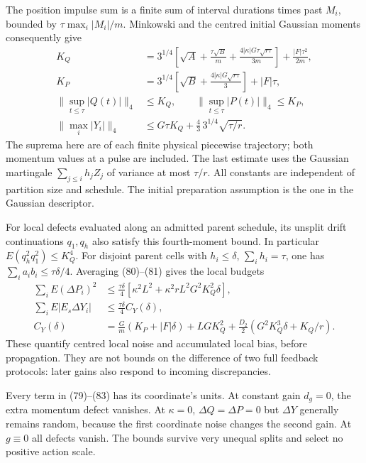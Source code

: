 \documentclass[11pt,a4paper]{article}
\begin{document}
The position impulse sum is a finite sum of interval durations times
past \(M_i\), bounded by \(\tau\max_i|M_i|/m\). Minkowski and the
centred initial Gaussian moments consequently give \[\begin{aligned}
K_Q&=3^{1/4}\left[\sqrt A+\frac{\tau\sqrt B}m
 +\frac{4|\kappa|G\tau\sqrt{r\tau}}{3m}\right]
                 +\frac{|F|\tau^2}{2m},\\
K_P&=3^{1/4}\left[\sqrt B
 +\frac{4|\kappa|G\sqrt{r\tau}}3\right]+|F|\tau,\\
\|\sup_{t\le\tau}|Q(t)|\|_4&\le K_Q,\qquad
\|\sup_{t\le\tau}|P(t)|\|_4\le K_P,\\
\|\max_i|Y_i|\|_4&\le G\tau K_Q
                       +\frac43\,3^{1/4}\sqrt{\tau/r}.
\end{aligned}\tag{82}\] The suprema here are of each finite physical
piecewise trajectory; both momentum values at a pulse are included. The
last estimate uses the Gaussian martingale \(\sum_{j\le i}h_jZ_j\) of
variance at most \(\tau/r\). All constants are independent of partition
size and schedule. The initial preparation assumption is the one in the
Gaussian descriptor.

For local defects evaluated along an admitted parent schedule, its
unsplit drift continuations \(q_1,q_h\) also satisfy this fourth-moment
bound. In particular \(E(q_h^2q_1^2)\le K_Q^4\). For disjoint parent
cells with \(h_i\le\delta\), \(\sum_ih_i=\tau\), one has
\(\sum_i a_ib_i\le\tau\delta/4\). Averaging (80)--(81) gives the local
budgets \[\begin{aligned}
\sum_iE(\Delta P_i)^2
&\le\frac{\tau\delta}4
 [\kappa^2L^2+\kappa^2rL^2G^2K_Q^2\delta],\\
\sum_iE|E_s\Delta Y_i|
&\le\frac{\tau\delta}4 C_Y(\delta),\\
C_Y(\delta)&=
\frac Gm(K_P+|F|\delta)+LGK_Q^2
 +\frac{D_2}2(G^2K_Q^3\delta+K_Q/r).
\end{aligned}\tag{83}\] These quantify centred local noise and
accumulated local bias, before propagation. They are not bounds on the
difference of two full feedback protocols: later gains also respond to
incoming discrepancies.

Every term in (79)--(83) has its coordinate's units. At constant gain
\(d_g=0\), the extra momentum defect vanishes. At \(\kappa=0\),
\(\Delta Q=\Delta P=0\) but \(\Delta Y\) generally remains random,
because the first coordinate noise changes the second gain. At
\(g\equiv0\) all defects vanish. The bounds survive very unequal splits
and select no positive action scale.
\end{document}
